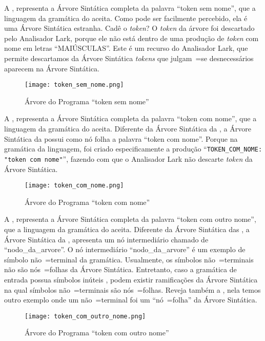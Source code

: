 A ,
representa a Árvore Sintática completa da palavra ``token sem nome'',
que a linguagem da gramática do  aceita.
Como pode ser facilmente percebido,
ela é uma Árvore Sintática estranha.
Cadê o \textit{token}?
O \textit{token} da árvore foi descartado pelo Analisador Lark,
porque ele não está dentro de uma produção de \textit{token} com nome em letras ``MAIÚSCULAS''.
Este é um recurso do Analisador Lark,
que permite descartamos da Árvore Sintática \textit{tokens} que julgam~=se desnecessários aparecem na Árvore Sintática.
\begin{figure}[H]
\caption{Árvore do Programa ``token sem nome''}
\label{figure:ArvoresDosTokens1}
\centering
\texttt{[image: token\_sem\_nome.png]}
\end{figure}

A ,
representa a Árvore Sintática completa da palavra ``token com nome'',
que a linguagem da gramática do  aceita.
Diferente da Árvore Sintática da ,
a Árvore Sintática da  possui como nó folha a palavra ``token com nome''.
Porque na gramática da linguagem,
foi criado especificamente a produção ``\texttt{TOKEN_COM_NOME:
"token com nome"}'',
fazendo com que o Analisador Lark não descarte \textit{token} da Árvore Sintática.
\begin{figure}[H]
\caption{Árvore do Programa ``token com nome''}
\label{figure:ArvoresDosTokens2}
\centering
\texttt{[image: token\_com\_nome.png]}
\end{figure}

A ,
representa a Árvore Sintática completa da palavra ``token com outro nome'',
que a linguagem da gramática do  aceita.
Diferente da Árvore Sintática das ,
a Árvore Sintática da ,
apresenta um nó intermediário chamado de ``nodo\_da\_arvore''.
O nó intermediário ``nodo\_da\_arvore'' é um exemplo de símbolo não~=terminal da gramática.
Usualmente,
os símbolos não~=terminais não são nós~=folhas da Árvore Sintática.
Entretanto,
caso a gramática de entrada possua símbolos inúteis \cite{hopcroftBook},
podem existir ramificações da Árvore Sintática na qual símbolos não~=terminais são nós~=folhas.
Reveja também a ,
nela temos outro exemplo onde um não~=terminal foi um ``nó~=folha'' da Árvore Sintática.
\begin{figure}[H]
\caption{Árvore do Programa ``token com outro nome''}
\label{figure:ArvoresDosTokens3}
\centering
\texttt{[image: token\_com\_outro\_nome.png]}
\end{figure}

